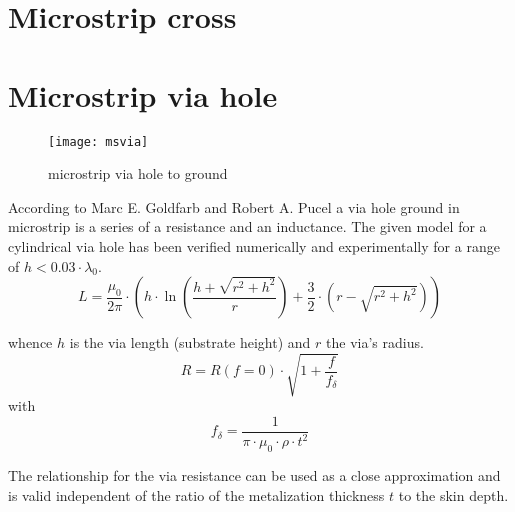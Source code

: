 \section{Microstrip cross}

\section{Microstrip via hole}

\begin{figure}[ht]
\begin{center}
\texttt{[image: msvia]}
\end{center}
\caption{microstrip via hole to ground}
\label{fig:MSvia}
\end{figure}
\FloatBarrier

According to Marc E. Goldfarb and Robert A. Pucel \cite{Goldfarb} a
via hole ground in microstrip is a series of a resistance and an
inductance.  The given model for a cylindrical via hole has been
verified numerically and experimentally for a range of $h <
0.03\cdot\lambda_0$.
\begin{equation}
L = \dfrac{\mu_0}{2\pi}\cdot\left(h\cdot \ln{\left(\dfrac{h + \sqrt{r^2 + h^2}}{r}\right)} + \dfrac{3}{2}\cdot\left(r - \sqrt{r^2 + h^2}\right)\right)
\end{equation}

whence $h$ is the via length (substrate height) and $r$ the via's
radius.
\begin{equation}
R = R\left(f = 0\right)\cdot \sqrt{1 + \dfrac{f}{f_\delta}}
\end{equation}
with
\begin{equation}
f_\delta = \dfrac{1}{\pi\cdot \mu_0\cdot \rho\cdot t^2}
\end{equation}

The relationship for the via resistance can be used as a close
approximation and is valid independent of the ratio of the
metalization thickness $t$ to the skin depth.

